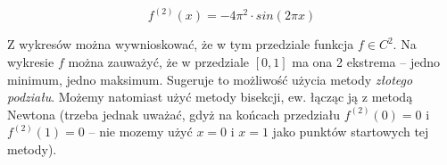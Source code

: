 \documentclass[a4paper,11pt]{article}
\begin{document}
      \begin{center}
      \end{center}
      $$ f^{(2)}(x) = -4 \pi^2 \cdot sin(2 \pi x) $$
      
      Z wykresów można wywnioskować, że w tym przedziale funkcja $ f \in C^2 $. Na wykresie $ f $ można zauważyć, że w przedziale $[0,1]$ ma ona 2 ekstrema -- jedno minimum, jedno maksimum. Sugeruje to możliwość użycia metody \emph{złotego podziału}. Możemy natomiast użyć metody bisekcji, ew. łącząc ją z metodą Newtona (trzeba jednak uważać, gdyż na końcach przedziału $f^{(2)}(0) = 0$ i $f^{(2)}(1) = 0$ -- nie mozemy użyć $ x = 0 $ i $ x = 1 $ jako punktów startowych tej metody).
      
\end{document}
